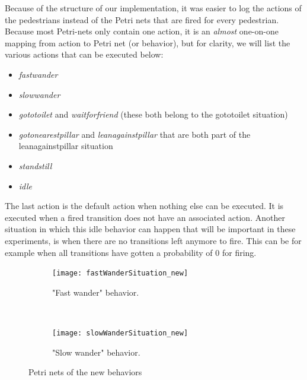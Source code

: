 \documentclass[11pt, a4paper]{book}
\begin{document}
Because of the structure of our implementation, it was easier to log the actions of the pedestrians instead of the Petri nets that are fired for every pedestrian. Because most Petri-nets only contain one action, it is an \emph{almost} one-on-one mapping from action to  Petri net (or behavior), but for clarity, we will list the various actions that can be executed below:\\
\begin{itemize}
\item \emph{fastwander}
\item \emph{slowwander}
\item \emph{gototoilet} and \emph{waitforfriend} (these both belong to the gototoilet situation)
\item \emph{gotonearestpillar} and \emph{leanagainstpillar} that are both part of the leanagainstpillar situation 
\item \emph{standstill}
\item \emph{idle}
\end{itemize}
The last action is the default action when nothing else can be executed. It is executed when a fired transition does not have an associated action. Another situation in which this idle behavior can happen that will be important in these experiments, is when there are no transitions left anymore to fire. This can be for example when all transitions have gotten a probability of 0 for firing.


\begin{figure}
        \centering
        \begin{subfigure}[b]{0.5\textwidth}
                \texttt{[image: fastWanderSituation\_new]}
                \caption{"Fast wander" behavior.}
                \label{fig:fastWanderPetrinet}
        \end{subfigure}%
        ~ %
        \begin{subfigure}[b]{0.5\textwidth}
                \texttt{[image: slowWanderSituation\_new]}
                \caption{"Slow wander" behavior.}
                \label{fig:slowWanderPetrinet}
        \end{subfigure}
        \caption{Petri nets of the new behaviors}\label{fig:newSituations}
\end{figure}
\end{document}
